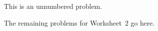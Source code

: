 \documentclass[11pt,letterpaper]{article}
\begin{document}


\prob This is an unnumbered problem. \pspace


\problem The remaining problems for Worksheet~2 go here.
\end{document}
